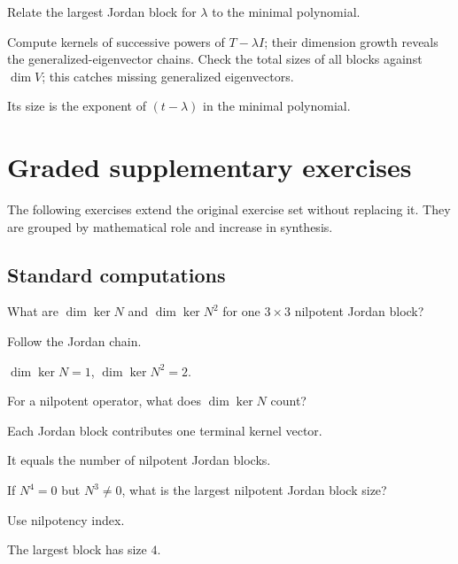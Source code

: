 \begin{exercise}\label{exr:i12-08}
Relate the largest Jordan block for $\lambda$ to the minimal polynomial.
\end{exercise}
\begin{hint}
Compute kernels of successive powers of \(T-\lambda I\); their dimension growth reveals the generalized-eigenvector chains. Check the total sizes of all blocks against \(\dim V\); this catches missing generalized eigenvectors.
\end{hint}
\begin{solution}
Its size is the exponent of $(t-\lambda)$ in the minimal polynomial.
\end{solution}


\section{Graded supplementary exercises}
The following exercises extend the original exercise set without replacing it. They are grouped by mathematical role and increase in synthesis.

\subsection*{Standard computations}

\begin{exercise}\label{exr:i12-expand-01}
What are \(\dim\ker N\) and \(\dim\ker N^2\) for one \(3\times3\) nilpotent Jordan block?
\end{exercise}
\begin{hint}
Follow the Jordan chain.
\end{hint}
\begin{solution}
\(\dim\ker N=1\), \(\dim\ker N^2=2\).
\end{solution}

\begin{exercise}\label{exr:i12-expand-02}
For a nilpotent operator, what does \(\dim\ker N\) count?
\end{exercise}
\begin{hint}
Each Jordan block contributes one terminal kernel vector.
\end{hint}
\begin{solution}
It equals the number of nilpotent Jordan blocks.
\end{solution}

\begin{exercise}\label{exr:i12-expand-03}
If \(N^4=0\) but \(N^3\neq0\), what is the largest nilpotent Jordan block size?
\end{exercise}
\begin{hint}
Use nilpotency index.
\end{hint}
\begin{solution}
The largest block has size \(4\).
\end{solution}

